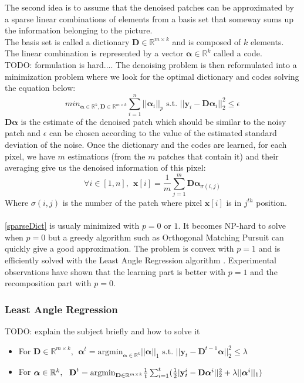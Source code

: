 \documentclass{ipol}
\newcommand{\psize}{m}
\newcommand{\dsize}{k}
\newcommand{\dict}{\textbf{D}}
\newcommand{\code}{\bm{\alpha}}
\newcommand{\pnorm}{p}
\newcommand{\denoi}{\textbf{x}}
\newcommand{\noi}{\textbf{y}}
\newcommand{\RR}{\mathbb{R}}
\newcommand{\argmin}{\text{argmin}}
\begin{document}
The second idea is to assume that the denoised patches can be approximated by a sparse linear combinations of elements from a basis set that someway sums up the information belonging to the picture.\\
The basis set is called a dictionary $\dict \in \RR^{\psize \times \dsize}$ and is composed of $\dsize$ elements. The linear combination is represented by a vector $\code \in \RR^{\dsize}$ called a code.\\
TODO: formulation is hard....
The denoising problem is then reformulated into a minimization problem where we look for the optimal dictionary and codes solving the equation below:
\begin{equation}
	min_{\code\in \RR^\dsize, \dict \in \RR^{\psize \times \dsize}} \sum_{i=1}^{n} ||\code_i||_\pnorm \text{ s.t. } ||\noi_i  - \dict \code_i||^2_2 \leqslant \epsilon
	\label{sparseDict}
\end{equation}
$\dict \code$ is the estimate of the denoised patch which should be similar to the noisy patch and $\epsilon$ can be chosen according to the value of the estimated standard deviation of the noise.
Once the dictionary and the codes are learned, for each pixel, we have $\psize$ estimations (from the $\psize$ patches that contain it) and their averaging give us the denoised information of this pixel:
\begin{equation}
	\forall i \in [1,n], \ \ \denoi[i] = \frac{1}{\psize} \sum_{j=1}^\psize \dict \code_{\sigma(i,j)}
\end{equation}
Where $\sigma(i,j)$ is the number of the patch where pixel $\denoi[i]$ is in $j^{th}$ position.\\
\\
\eqref{sparseDict} is usualy minimized with $\pnorm = 0$ or $1$. It becomes NP-hard to solve when $\pnorm=0$ but a greedy algorithm such as Orthogonal Matching Pursuit \cite{OMP} can quickly give a good approximation. The problem is convex with $\pnorm=1$ and is efficiently solved with the Least Angle Regression algorithm \cite{LARS}. Experimental observations \cite{l0l1} have shown that the learning part is better with $\pnorm=1$ and the recomposition part with $\pnorm=0$.\\

\subsubsection{Least Angle Regression}

TODO: explain the subject briefly and how to solve it
\begin{itemize}
	\item For $\dict \in \RR^{\psize \times \dsize}, \ \ \code^t = \argmin_{\code \in \RR^\dsize} ||\code||_1 \text{ s.t. } ||\noi_t - \dict^{t-1} \code||_2^2 \leq \lambda$
	\item For $\code \in \RR^\dsize, \ \ \dict^{t}= \argmin_{\dict \in \RR^{\psize \times \dsize}} \frac{1}{t} \sum_{i=1}^t (\frac{1}{2}|\textbf{\noi}_t^i - \dict \code^i||^2_2 + \lambda ||\code^i||_1)$
\end{itemize}
\end{document}

